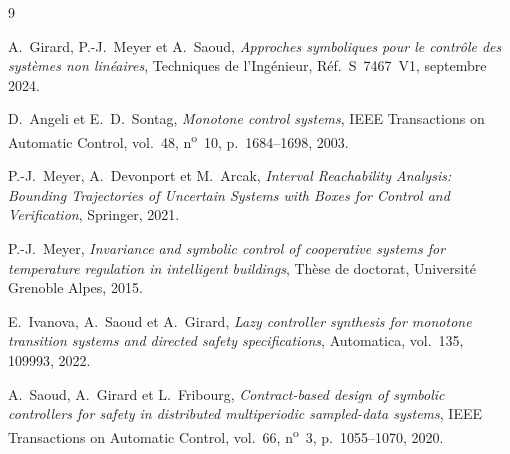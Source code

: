 \documentclass[11pt,a4paper]{article}
\theoremstyle{definition}
\theoremstyle{plain}
\begin{document}
\begin{thebibliography}{9}

A.~Girard, P.-J.~Meyer et A.~Saoud,
\emph{Approches symboliques pour le contrôle des systèmes non linéaires},
Techniques de l'Ingénieur, Réf.~S~7467~V1, septembre 2024.

D.~Angeli et E.~D.~Sontag,
\emph{Monotone control systems},
IEEE Transactions on Automatic Control, vol.~48, n\textsuperscript{o}~10, p.~1684--1698, 2003.

P.-J.~Meyer, A.~Devonport et M.~Arcak,
\emph{Interval Reachability Analysis: Bounding Trajectories of Uncertain Systems with Boxes for Control and Verification},
Springer, 2021.

P.-J.~Meyer,
\emph{Invariance and symbolic control of cooperative systems for temperature regulation in intelligent buildings},
Thèse de doctorat, Université Grenoble Alpes, 2015.

E.~Ivanova, A.~Saoud et A.~Girard,
\emph{Lazy controller synthesis for monotone transition systems and directed safety specifications},
Automatica, vol.~135, 109993, 2022.

A.~Saoud, A.~Girard et L.~Fribourg,
\emph{Contract-based design of symbolic controllers for safety in distributed multiperiodic sampled-data systems},
IEEE Transactions on Automatic Control, vol.~66, n\textsuperscript{o}~3, p.~1055--1070, 2020.

\end{thebibliography}
\end{document}
